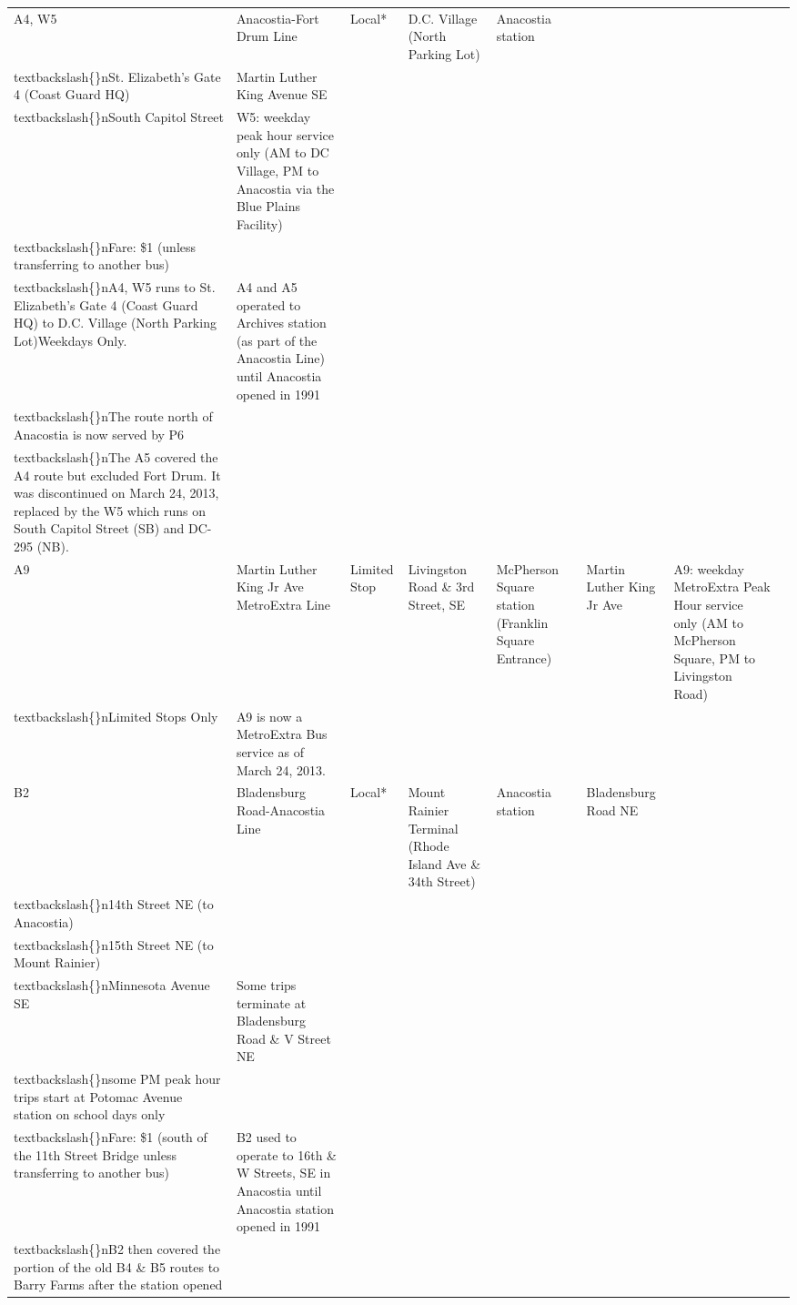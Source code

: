 \documentclass{article}
\begin{document}
\begin{tabular}{llllllll}
A4, W5 & Anacostia-Fort Drum Line & Local* & D.C. Village (North Parking Lot) & Anacostia station\\textbackslash\{\}nSt. Elizabeth's Gate 4 (Coast Guard HQ) & Martin Luther King Avenue SE\\textbackslash\{\}nSouth Capitol Street & W5: weekday peak hour service only (AM to DC Village, PM to Anacostia via the Blue Plains Facility)\\textbackslash\{\}nFare: \$1 (unless transferring to another bus)\\textbackslash\{\}nA4, W5 runs to St. Elizabeth's Gate 4 (Coast Guard HQ) to D.C. Village (North Parking Lot)Weekdays Only. & A4 and A5 operated to Archives station (as part of the Anacostia Line) until Anacostia opened in 1991\\textbackslash\{\}nThe route north of Anacostia is now served by P6\\textbackslash\{\}nThe A5 covered the A4 route but excluded Fort Drum. It was discontinued on March 24, 2013, replaced by the W5 which runs on South Capitol Street (SB) and DC-295 (NB). \\
A9 & Martin Luther King Jr Ave MetroExtra Line & Limited Stop & Livingston Road \& 3rd Street, SE & McPherson Square station (Franklin Square Entrance) & Martin Luther King Jr Ave & A9: weekday MetroExtra Peak Hour service only (AM to McPherson Square, PM to Livingston Road)\\textbackslash\{\}nLimited Stops Only & A9 is now a MetroExtra Bus service as of March 24, 2013. \\
B2 & Bladensburg Road-Anacostia Line & Local* & Mount Rainier Terminal (Rhode Island Ave \& 34th Street) & Anacostia station & Bladensburg Road NE\\textbackslash\{\}n14th Street NE (to Anacostia)\\textbackslash\{\}n15th Street NE (to Mount Rainier)\\textbackslash\{\}nMinnesota Avenue SE & Some trips terminate at Bladensburg Road \& V Street NE\\textbackslash\{\}nsome PM peak hour trips start at Potomac Avenue station on school days only\\textbackslash\{\}nFare: \$1 (south of the 11th Street Bridge unless transferring to another bus) & B2 used to operate to 16th \& W Streets, SE in Anacostia until Anacostia station opened in 1991\\textbackslash\{\}nB2 then covered the portion of the old B4 \& B5 routes to Barry Farms after the station opened \\

\end{tabular}
\end{document}
